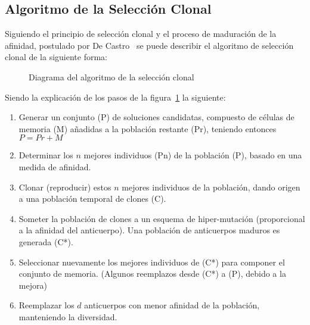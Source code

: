 \subsection{Algoritmo de la Selección Clonal}



Siguiendo el principio de selección clonal y el proceso de maduración de la afinidad, postulado por De Castro~\cite{decastro} se puede describir el algoritmo de selección clonal de la siguiente forma:
\begin{figure}[h!]
\begin{center}
\end{center}
\caption{Diagrama del algoritmo de la selección clonal}
\label{fig:algoritmo}
\end{figure}

Siendo la explicación de los pasos de la figura~\ref{fig:algoritmo} la siguiente:
\begin{enumerate}
    \item Generar un conjunto (P) de soluciones candidatas, compuesto de células de memoria (M) añadidas a la población restante (Pr), teniendo entonces $P = Pr + M$
    \item Determinar los $n$ mejores individuos (Pn) de la población (P), basado en una medida de afinidad.
    \item Clonar (reproducir) estos $n$ mejores individuos de la población, dando origen a una población temporal de clones (C).
    \item Someter la población de clones a un esquema de hiper-mutación (proporcional a la afinidad del anticuerpo). Una población de anticuerpos maduros es generada (C*).
    \item Seleccionar nuevamente los mejores individuos de (C*) para componer el conjunto de memoria. (Algunos reemplazos desde (C*) a (P), debido a la mejora)
    \item Reemplazar los $d$ anticuerpos con menor afinidad de la población, manteniendo la diversidad.
\end{enumerate}

